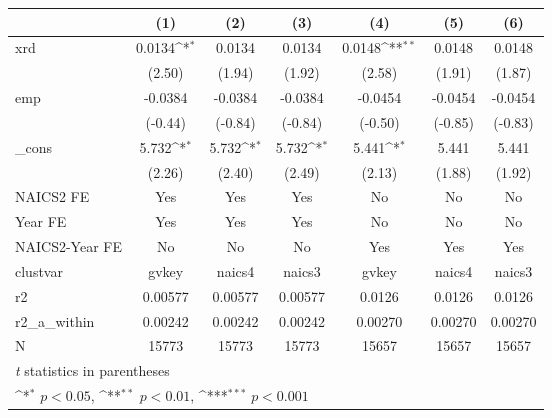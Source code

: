 {
\def\sym#1{\ifmmode^{#1}\else\(^{#1}\)\fi}
\begin{tabular}{l*{6}{c}}
\hline\hline
            &\multicolumn{1}{c}{(1)}         &\multicolumn{1}{c}{(2)}         &\multicolumn{1}{c}{(3)}         &\multicolumn{1}{c}{(4)}         &\multicolumn{1}{c}{(5)}         &\multicolumn{1}{c}{(6)}         \\
\hline
xrd         &      0.0134\sym{*}  &      0.0134         &      0.0134         &      0.0148\sym{**} &      0.0148         &      0.0148         \\
            &      (2.50)         &      (1.94)         &      (1.92)         &      (2.58)         &      (1.91)         &      (1.87)         \\
[1em]
emp         &     -0.0384         &     -0.0384         &     -0.0384         &     -0.0454         &     -0.0454         &     -0.0454         \\
            &     (-0.44)         &     (-0.84)         &     (-0.84)         &     (-0.50)         &     (-0.85)         &     (-0.83)         \\
[1em]
\_cons      &       5.732\sym{*}  &       5.732\sym{*}  &       5.732\sym{*}  &       5.441\sym{*}  &       5.441         &       5.441         \\
            &      (2.26)         &      (2.40)         &      (2.49)         &      (2.13)         &      (1.88)         &      (1.92)         \\
[1em]
NAICS2 FE   &         Yes         &         Yes         &         Yes         &          No         &          No         &          No         \\
[1em]
Year FE     &         Yes         &         Yes         &         Yes         &          No         &          No         &          No         \\
[1em]
NAICS2-Year FE&          No         &          No         &          No         &         Yes         &         Yes         &         Yes         \\
\hline
clustvar    &       gvkey         &      naics4         &      naics3         &       gvkey         &      naics4         &      naics3         \\
r2          &     0.00577         &     0.00577         &     0.00577         &      0.0126         &      0.0126         &      0.0126         \\
r2\_a\_within &     0.00242         &     0.00242         &     0.00242         &     0.00270         &     0.00270         &     0.00270         \\
N           &       15773         &       15773         &       15773         &       15657         &       15657         &       15657         \\
\hline\hline
\multicolumn{7}{l}{\footnotesize \textit{t} statistics in parentheses}\\
\multicolumn{7}{l}{\footnotesize \sym{*} \(p<0.05\), \sym{**} \(p<0.01\), \sym{***} \(p<0.001\)}\\
\end{tabular}
}

